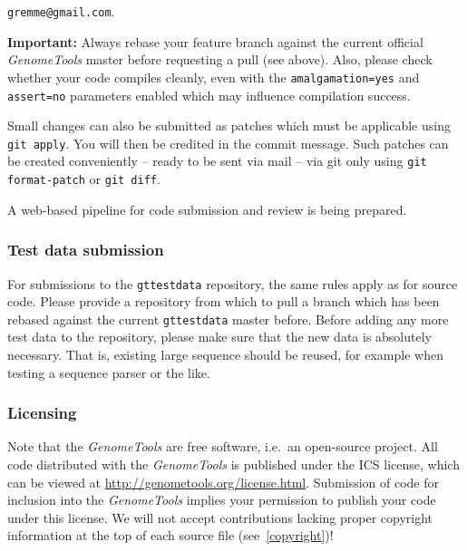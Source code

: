 \documentclass[11pt,final]{article}
\newcommand{\keyword}[1]{\lstinline{#1}}
\newcommand{\Gt}[0]{\emph{GenomeTools}\xspace}
\begin{document}
\centerline{\texttt{gremme@gmail.com}.}

\textbf{Important:} Always rebase your feature branch against the current
official \Gt master before requesting a pull (see above). Also, please check
whether your code compiles cleanly, even with the \keyword{amalgamation=yes}
and \keyword{assert=no} parameters enabled which may influence compilation
success.

Small changes can also be submitted as patches which must be applicable using
\keyword{git apply}. You will then be credited in the commit message. Such
patches can be created conveniently -- ready to be sent via mail -- via git
only using \keyword{git format-patch} or \keyword{git diff}.

A web-based pipeline for code submission and review is being prepared. 

\subsubsection{Test data submission}

For submissions to the \keyword{gttestdata} repository, the same rules apply
as for source code. Please provide a repository from which to pull a branch
which has been rebased against the current \keyword{gttestdata} master before.
Before adding any more test data to the repository, please make sure that
the new data is absolutely necessary. That is, existing large sequence should be
reused, for example when testing a sequence parser or the like.

\subsubsection{Licensing}

Note that the \Gt are free software, i.e.\ an open-source project.
All code distributed with the \Gt is published under the ICS license,
which can be viewed at \url{http://genometools.org/license.html}. Submission of
code for inclusion into the \Gt implies your permission to publish your code
under this license. We will not accept contributions lacking proper
copyright information at the top of each source file (see~\ref{copyright})!
\end{document}
